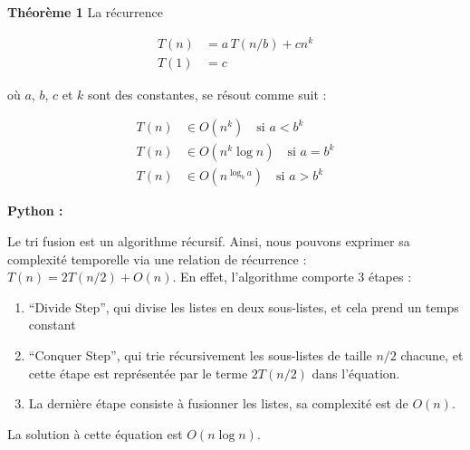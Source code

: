 \begin{Exercice} [30 minutes]
    \begin{conseil}
\textbf{Théorème 1} \quad La récurrence

\begin{align*}
T(n) &= a\,T(n/b) + c n^{k} \\
T(1) &= c
\end{align*}

où $a$, $b$, $c$ et $k$ sont des constantes, se résout comme suit :

\begin{align*}
T(n) &\in O(n^{k}) \quad \text{si } a < b^{k} \\
T(n) &\in O(n^{k} \log n) \quad \text{si } a = b^{k} \\
T(n) &\in O(n^{\log_{b}{a}}) \quad \text{si } a > b^{k}
\end{align*}

    \end{conseil}
    
    \begin{solution}
        \textbf{Python :}
        
    \end{solution}

    \begin{solution}

    \end{solution}
   
    \begin{solution}
        Le tri fusion est un algorithme récursif. Ainsi, nous pouvons exprimer sa complexité temporelle via une relation de récurrence : $T(n) = 2T(n/2) + O(n)$. En effet, l'algorithme comporte 3 étapes :
        \begin{enumerate}
            \item ``Divide Step'', qui divise les listes en deux sous-listes, et cela prend un temps constant
            \item ``Conquer Step'', qui trie récursivement les sous-listes de taille $n/2$ chacune, et cette étape est représentée par le terme $2T(n/2)$ dans l'équation.
            \item La dernière étape consiste à fusionner les listes, sa complexité est de $O(n)$.
        \end{enumerate}
        La solution à cette équation est $O(n \log n)$.
    \end{solution}
\end{Exercice}



